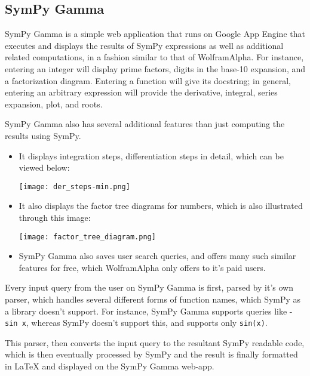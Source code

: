 \subsection{SymPy Gamma}\label{sympy-gamma}

SymPy Gamma is a simple web application that runs on Google App Engine 
that executes and displays the results of SymPy expressions as well as
additional related computations, in a fashion similar to that of
Wolfram\textbar{}Alpha. For instance, entering an integer will display
prime factors, digits in the base-10 expansion, and a factorization
diagram. Entering a function will give its docstring; in general,
entering an arbitrary expression will provide the derivative, integral,
series expansion, plot, and roots.

SymPy Gamma also has several additional features than just computing the
results using SymPy.

\begin{itemize}
\item
  It displays integration steps, differentiation steps in detail, which
  can be viewed below:\par
\begin{minipage}{\textwidth}
    \centering
    \texttt{[image: der\_steps-min.png]}
\end{minipage}
\item
  It also displays the factor tree diagrams for numbers, which is also
  illustrated through this image:\par
\begin{minipage}{\textwidth}
    \centering
    \texttt{[image: factor\_tree\_diagram.png]}
\end{minipage}
\item
  SymPy Gamma also saves user search queries, and offers many such 
  similar features for free, which Wolfram\textbar{}Alpha only offers 
  to it's paid users.
\end{itemize}
Every input query from the user on SymPy Gamma is first, parsed by it's
own parser, which handles several different forms of function names,
which SymPy as a library doesn't support. For instance, SymPy Gamma
supports queries like - \texttt{sin\ x}, whereas SymPy doesn't support
this, and supports only \texttt{sin(x)}.

This parser, then converts the input query to the resultant SymPy
readable code, which is then eventually processed by SymPy and the
result is finally formatted in LaTeX and displayed on the SymPy Gamma
web-app.